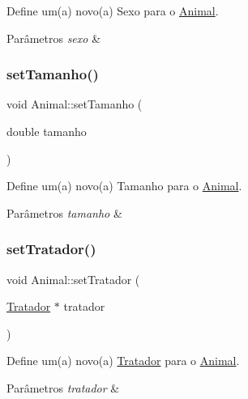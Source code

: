 Define um(a) novo(a) Sexo para o \hyperlink{classAnimal}{Animal}. 


\begin{DoxyParams}{Parâmetros}
{\em sexo} & \\
\hline
\end{DoxyParams}
\mbox{\label{classAnimal_a53daf7711c6b6430c723647b2cec7c36}} 
\subsubsection{\texorpdfstring{set\+Tamanho()}{setTamanho()}}
{\footnotesize\ttfamily void Animal\+::set\+Tamanho (\begin{DoxyParamCaption}\item[{double}]{tamanho }\end{DoxyParamCaption})}



Define um(a) novo(a) Tamanho para o \hyperlink{classAnimal}{Animal}. 


\begin{DoxyParams}{Parâmetros}
{\em tamanho} & \\
\hline
\end{DoxyParams}
\mbox{\label{classAnimal_aec8cd2eec7a0c833074e303f389c8f9f}} 
\subsubsection{\texorpdfstring{set\+Tratador()}{setTratador()}}
{\footnotesize\ttfamily void Animal\+::set\+Tratador (\begin{DoxyParamCaption}\item[{\hyperlink{classTratador}{Tratador} $\ast$}]{tratador }\end{DoxyParamCaption})}



Define um(a) novo(a) \hyperlink{classTratador}{Tratador} para o \hyperlink{classAnimal}{Animal}. 


\begin{DoxyParams}{Parâmetros}
{\em tratador} & \\
\hline
\end{DoxyParams}
\mbox{\label{classAnimal_ace9b58ea47057261292ce42a4edd2870}} 
